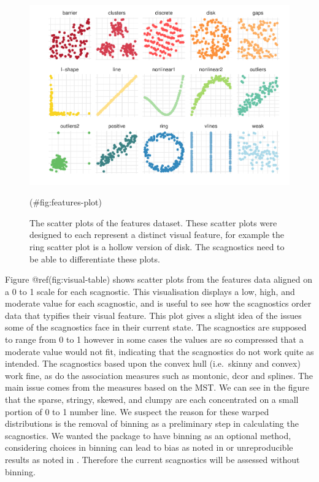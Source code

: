\begin{Schunk}
\begin{figure}
\includegraphics[width=1\linewidth]{mason-lee-laa-cook_files/figure-latex/features-plot-1} \caption[The scatter plots of the features dataset]{The scatter plots of the features dataset. These scatter plots were designed to each represent a distinct visual feature, for example the ring scatter plot is a hollow version of disk. The scagnostics need to be able to differentiate these plots.}(\#fig:features-plot)
\end{figure}
\end{Schunk}

Figure @ref(fig:visual-table) shows scatter plots from the features data
aligned on a 0 to 1 scale for each scagnostic. This visualisation
displays a low, high, and moderate value for each scagnostic, and is
useful to see how the scagnostics order data that typifies their visual
feature. This plot gives a slight idea of the issues some of the
scagnostics face in their current state. The scagnostics are supposed to
range from 0 to 1 however in some cases the values are so compressed
that a moderate value would not fit, indicating that the scagnostics do
not work quite as intended. The scagnostics based upon the convex hull
(i.e.~skinny and convex) work fine, as do the association measures such
as montonic, dcor and splines. The main issue comes from the measures
based on the MST. We can see in the figure that the sparse, stringy,
skewed, and clumpy are each concentrated on a small portion of 0 to 1
number line. We suspect the reason for these warped distributions is the
removal of binning as a preliminary step in calculating the scagnostics.
We wanted the package to have binning as an optional method, considering
choices in binning can lead to bias as noted in \citet{scagdist} or
unreproducible results as noted in \citet{robust}. Therefore the current
scagnostics will be assessed without binning.

